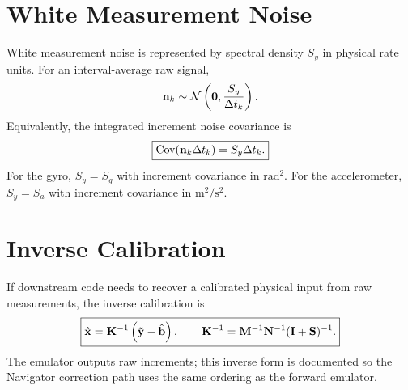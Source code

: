 \section{White Measurement Noise}

White measurement noise is represented by spectral density $S_y$ in physical
rate units. For an interval-average raw signal,
\begin{equation}
\mathbf{n}_k\sim
\mathcal{N}
\left(
\mathbf{0},
\frac{S_y}{\Delta t_k}
\right).
\label{eq:imu_interval_average_white_noise}
\end{equation}
Equivalently, the integrated increment noise covariance is
\begin{equation}
\boxed{
\operatorname{Cov}(\mathbf{n}_k\Delta t_k)=S_y\Delta t_k.
}
\label{eq:imu_increment_white_noise_covariance}
\end{equation}
For the gyro, $S_y=S_g$ with increment covariance in
$\si{\radian^2}$. For the accelerometer, $S_y=S_a$ with increment covariance in
$\si{\meter^2\per\second^2}$.

\section{Inverse Calibration}

If downstream code needs to recover a calibrated physical input from raw
measurements, the inverse calibration is
\begin{equation}
\boxed{
\hat{\mathbf{x}}
=
\mathbf{K}^{-1}
\left(
\tilde{\mathbf{y}}-\hat{\mathbf{b}}
\right),
\qquad
\mathbf{K}^{-1}
=
\mathbf{M}^{-1}\mathbf{N}^{-1}(\mathbf{I}+\mathbf{S})^{-1}.
}
\label{eq:imu_inverse_calibration}
\end{equation}
The emulator outputs raw increments; this inverse form is documented so the
Navigator correction path uses the same ordering as the forward emulator.
